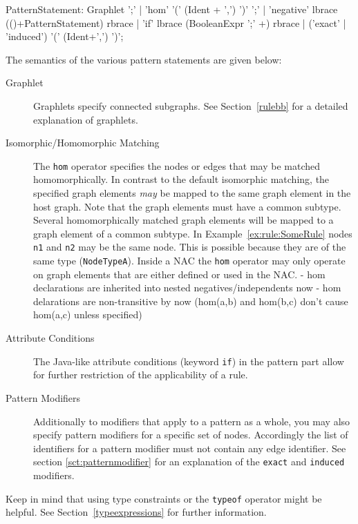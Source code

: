 \begin{rail}  
  PatternStatement: 
    Graphlet ';' |
    'hom' '(' (Ident + ',') ')' ';' |
    'negative' lbrace (()+PatternStatement) rbrace |
    'if' lbrace (BooleanExpr ';' +) rbrace |
    ('exact' | 'induced') '(' (Ident+',') ')';
\end{rail}
The semantics of the various pattern statements are given below:
\begin{description}
  \item[Graphlet] Graphlets specify connected subgraphs. See Section~\ref{rulebb} for a detailed explanation of graphlets.
  \item[Isomorphic/Homomorphic Matching] The \texttt{hom} operator specifies the nodes or edges that may be matched homomorphically. 
  In contrast to the default isomorphic matching, the specified graph elements \emph{may} be mapped to the same graph element in the host graph. Note that the graph elements must have a common subtype. 
  Several homomorphically matched graph elements will be mapped to a graph element of a common subtype.
  In Example~\ref{ex:rule:SomeRule} nodes \texttt{n1} and \texttt{n2} may be the same node. This is possible because they are of the same type (\texttt{NodeTypeA}).
  Inside a NAC the \texttt{hom} operator may only operate on graph elements that are either defined or used in the NAC.
 - hom declarations are inherited into nested negatives/independents now
 - hom delarations are non-transitive by now (hom(a,b) and hom(b,c) don't cause hom(a,c) unless specified)
   \item[Attribute Conditions] The Java-like attribute conditions (keyword \texttt{if}) in the pattern part allow for further restriction of the applicability of a rule.
  \item[Pattern Modifiers] Additionally to modifiers that apply to a pattern as a whole, you may also specify pattern modifiers for a specific set of nodes. Accordingly the list of identifiers for a pattern modifier must not contain any edge identifier. See section \ref{sct:patternmodifier} for an explanation of the \texttt{exact} and \texttt{induced} modifiers. 
\end{description}

Keep in mind that using type constraints or the \texttt{typeof} operator might be helpful. See Section~\ref{typeexpressions} for further information.



